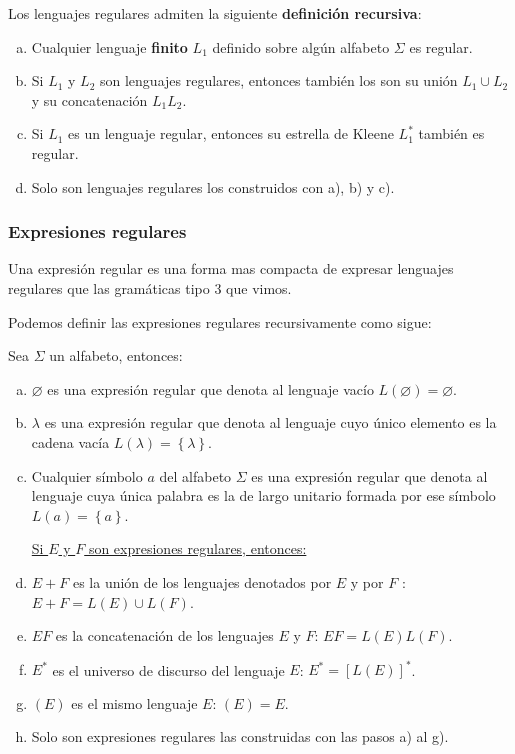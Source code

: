 \documentclass[12pt]{article}
\begin{document}
Los lenguajes regulares admiten la siguiente \textbf{definición recursiva}:
\begin{enumerate}[a)]
  \item Cualquier lenguaje \textbf{finito} $ L_{1} $ definido sobre algún alfabeto $ \Sigma $ es regular.

  \item Si $ L_{1} $ y $ L_{2} $ son lenguajes regulares, entonces también los son su unión $ L_{1} \cup L_{2} $ y su concatenación $ L_{1}L_{2} $.

  \item Si $ L_{1} $ es un lenguaje regular, entonces su estrella de Kleene $ L_{1}^{*} $ también es regular.

  \item Solo son lenguajes regulares los construidos con a), b) y c).
\end{enumerate}

\subsubsection{Expresiones regulares}\label{sec:regex}
Una expresión regular es una forma mas compacta de expresar lenguajes regulares que las gramáticas tipo 3 que vimos.

Podemos definir las expresiones regulares recursivamente como sigue:

Sea $ \Sigma $ un alfabeto, entonces:
\begin{enumerate}[a)]
  \item $ \varnothing $ es una expresión regular que denota al lenguaje vacío $ L(\varnothing ) = \varnothing  $.

  \item $ \lambda $ es una expresión regular que denota al lenguaje cuyo único elemento es la cadena vacía $ L(\lambda)=\left\{\lambda\right\} $.

  \item Cualquier símbolo $ a $ del alfabeto $ \Sigma $ es una expresión regular que denota al lenguaje cuya única palabra es la de largo unitario formada por ese símbolo $ L(a) = \left\{a\right\} $.
	  
  \underline{Si $ E $ y $ F $ son expresiones regulares, entonces: }

  \item $ E+F $ es la unión de los lenguajes denotados por $ E $ y por $ F $ $: \quad $ $ E+F = L(E) \cup L(F) $.

  \item $ EF $ es la concatenación de los lenguajes $ E $ y $ F $: \quad $ EF = L(E)L(F) $.

  \item $ E^{*} $ es el universo de discurso del lenguaje $ E $: \quad $ E^{*} = \left[L(E)\right]^{*} $.

  \item $ (E) $ es el mismo lenguaje $ E $: \quad $ (E) = E $.

  \item Solo son expresiones regulares las construidas con las pasos a) al g).
\end{enumerate}
\end{document}
